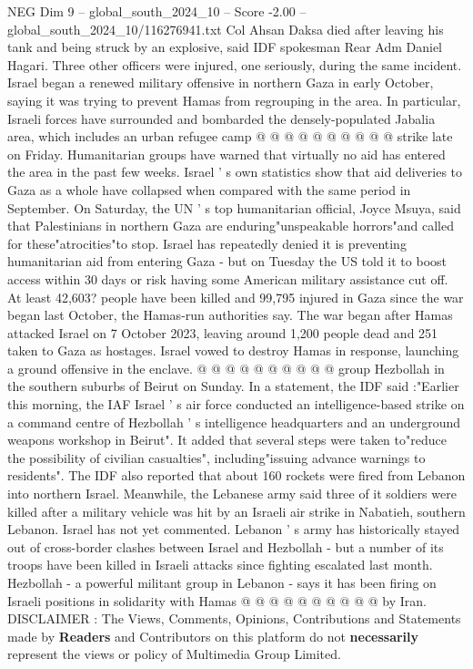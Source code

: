 \begin{textsample}{NEG Dim 9 – global\_south\_2024\_10 – Score -2.00 – global\_south\_2024\_10/116276941.txt}
Col Ahsan Daksa died after leaving his tank and being struck by an explosive, said IDF spokesman Rear Adm Daniel Hagari.
Three other officers were injured, one seriously, during the same incident.
Israel began a renewed military offensive in northern Gaza in early October, saying it was trying to prevent Hamas from regrouping in the area.
In particular, Israeli forces have surrounded and bombarded the densely-populated Jabalia area, which includes an urban refugee camp @ @ @ @ @ @ @ @ @ @ strike late on Friday.
Humanitarian groups have warned that virtually no aid has entered the area in the past few weeks.
Israel ' s own statistics show that aid deliveries to Gaza as a whole have collapsed when compared with the same period in September.
On Saturday, the UN ' s top humanitarian official, Joyce Msuya, said that Palestinians in northern Gaza are enduring"unspeakable horrors"and called for these"atrocities"to stop.
Israel has repeatedly denied it is preventing humanitarian aid from entering Gaza - but on Tuesday the US told it to boost access within 30 days or risk having some American military assistance cut off.
At least 42,603? people have been killed and 99,795 injured in Gaza since the war began last October, the Hamas-run authorities say.
The war began after Hamas attacked Israel on 7 October 2023, leaving around 1,200 people dead and 251 taken to Gaza as hostages.
Israel vowed to destroy Hamas in response, launching a ground offensive in the enclave. @ @ @ @ @ @ @ @ @ @ group Hezbollah in the southern suburbs of Beirut on Sunday.
In a statement, the IDF said :"Earlier this morning, the IAF Israel ' s air force conducted an intelligence-based strike on a command centre of Hezbollah ' s intelligence headquarters and an underground weapons workshop in Beirut".
It added that several steps were taken to"reduce the possibility of civilian casualties", including"issuing advance warnings to residents".
The IDF also reported that about 160 rockets were fired from Lebanon into northern Israel.
Meanwhile, the Lebanese army said three of it soldiers were killed after a military vehicle was hit by an Israeli air strike in Nabatieh, southern Lebanon.
Israel has not yet commented.
Lebanon ' s army has historically stayed out of cross-border clashes between Israel and Hezbollah - but a number of its troops have been killed in Israeli attacks since fighting escalated last month.
Hezbollah - a powerful militant group in Lebanon - says it has been firing on Israeli positions in solidarity with Hamas @ @ @ @ @ @ @ @ @ @ by Iran.
DISCLAIMER : The Views, Comments, Opinions, Contributions and Statements made by \textbf{Readers} and Contributors on this platform do not \textbf{necessarily} represent the views or policy of Multimedia Group Limited.

\end{textsample}
